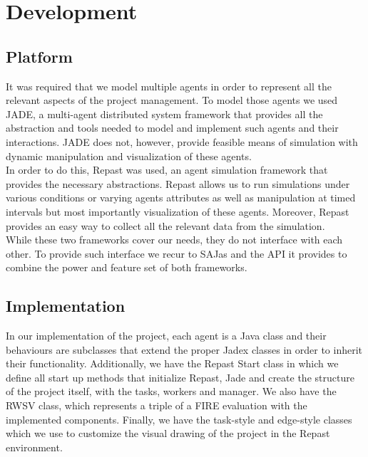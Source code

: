 \documentclass[paper=a4, fontsize=11pt]{scrartcl} %
\numberwithin{equation}{section} %
\numberwithin{figure}{section} %
\numberwithin{table}{section} %
\begin{document}
\section{Development}

\subsection{Platform}
It was required that we model multiple agents in order to represent all the relevant aspects of the project management. To model those agents we used JADE, a multi-agent distributed system framework that provides all the abstraction and tools needed to model and implement such agents and their interactions. JADE does not, however, provide feasible means of simulation with dynamic manipulation and visualization of these agents.\\
In order to do this, Repast was used, an agent simulation framework that provides the necessary abstractions. Repast allows us to run simulations under various conditions or varying agents attributes as well as manipulation at timed intervals but most importantly visualization of these agents. Moreover, Repast provides an easy way to collect all the relevant data from the simulation.\\
While these two frameworks cover our needs, they do not interface with each other. To provide such interface we recur to SAJas and the API it provides to combine the power and feature set of both frameworks.
\subsection{Implementation}
In our implementation of the project, each agent is a Java class and their behaviours are subclasses that extend the proper Jadex classes in order to inherit their functionality. Additionally, we have the Repast Start class in which we define all start up methods that initialize Repast, Jade and create the structure of the project itself, with the tasks, workers and manager. We also have the RWSV class, which represents a triple of a FIRE evaluation with the implemented components. Finally, we have the task-style and edge-style classes which we use to customize the visual drawing of the project in the Repast environment.
\end{document}
